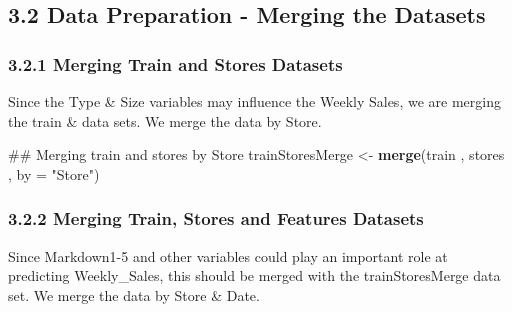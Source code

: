 \documentclass[]{article}
\newenvironment{Shaded}{\begin{snugshade}}{\end{snugshade}}
\newcommand{\KeywordTok}[1]{\textcolor[rgb]{0.13,0.29,0.53}{\textbf{{#1}}}}
\newcommand{\DataTypeTok}[1]{\textcolor[rgb]{0.13,0.29,0.53}{{#1}}}
\newcommand{\DecValTok}[1]{\textcolor[rgb]{0.00,0.00,0.81}{{#1}}}
\newcommand{\StringTok}[1]{\textcolor[rgb]{0.31,0.60,0.02}{{#1}}}
\newcommand{\OtherTok}[1]{\textcolor[rgb]{0.56,0.35,0.01}{{#1}}}
\newcommand{\NormalTok}[1]{{#1}}
\begin{document}
\pagebreak

\subsection{3.2 Data Preparation - Merging the
Datasets}\label{data-preparation---merging-the-datasets}

\subsubsection{3.2.1 Merging Train and Stores
Datasets}\label{merging-train-and-stores-datasets}

Since the Type \& Size variables may influence the Weekly Sales, we are
merging the train \& data sets. We merge the data by Store.

\begin{Shaded}
\begin{Highlighting}[]
\NormalTok{## Merging train and stores by Store}
\NormalTok{trainStoresMerge <-}\StringTok{ }\KeywordTok{merge}\NormalTok{(train , stores , }\DataTypeTok{by =} \StringTok{"Store"}\NormalTok{)}
\end{Highlighting}
\end{Shaded}

\subsubsection{3.2.2 Merging Train, Stores and Features
Datasets}\label{merging-train-stores-and-features-datasets}

Since Markdown1-5 and other variables could play an important role at
predicting Weekly\_Sales, this should be merged with the
trainStoresMerge data set. We merge the data by Store \& Date.

\begin{Shaded}
\end{Shaded}
\end{document}
